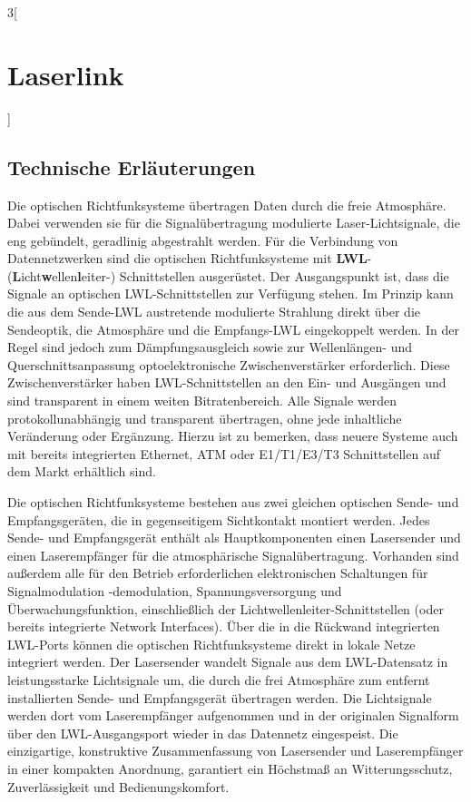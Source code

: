 \begin{multicols}{3}[\section{Laserlink}]
\subsection*{Technische Erläuterungen}
Die optischen Richtfunksysteme übertragen Daten durch die freie Atmosphäre. Dabei verwenden sie für die Signalübertragung modulierte Laser-Lichtsignale, die eng gebündelt, geradlinig abgestrahlt werden. Für die Verbindung von Datennetzwerken sind die optischen Richtfunksysteme mit  \textbf{LWL}- (\textbf{L}icht\textbf{w}ellen\textbf{l}eiter-) Schnittstellen ausgerüstet. Der Ausgangspunkt ist, dass die Signale an optischen LWL-Schnittstellen zur Verfügung stehen. Im Prinzip kann die aus dem Sende-LWL austretende modulierte Strahlung direkt über die Sendeoptik, die Atmosphäre und die Empfangs-LWL eingekoppelt werden. In der Regel sind jedoch zum Dämpfungsausgleich sowie zur Wellenlängen- und Querschnittsanpassung optoelektronische Zwischenverstärker erforderlich. Diese Zwischenverstärker haben LWL-Schnittstellen an den Ein- und Ausgängen und sind transparent in einem weiten Bitratenbereich. Alle Signale werden protokollunabhängig und transparent übertragen, ohne jede inhaltliche Veränderung oder Ergänzung. Hierzu ist zu bemerken, dass neuere Systeme auch mit bereits integrierten Ethernet, ATM oder E1/T1/E3/T3 Schnittstellen auf dem Markt erhältlich sind. 

Die optischen Richtfunksysteme bestehen aus zwei gleichen optischen Sende- und Empfangsgeräten, die in gegenseitigem Sichtkontakt montiert werden. Jedes Sende- und Empfangsgerät enthält als Hauptkomponenten einen Lasersender und einen Laserempfänger für die atmosphärische Signalübertragung. Vorhanden sind außerdem alle für den Betrieb erforderlichen elektronischen Schaltungen für Signalmodulation -demodulation, Spannungsversorgung und Überwachungsfunktion, einschließlich der Lichtwellenleiter-Schnittstellen (oder bereits integrierte Network Interfaces). Über die in die Rückwand integrierten LWL-Ports können die optischen Richtfunksysteme direkt in lokale Netze integriert werden. 
Der Lasersender wandelt Signale aus dem LWL-Datensatz in leistungsstarke Lichtsignale um, die durch die frei Atmosphäre zum entfernt installierten Sende- und Empfangsgerät übertragen werden. Die Lichtsignale werden dort vom Laserempfänger aufgenommen und in der originalen Signalform über den LWL-Ausgangsport wieder in das Datennetz eingespeist. Die einzigartige, konstruktive Zusammenfassung von Lasersender und Laserempfänger in einer kompakten Anordnung, garantiert ein Höchstmaß an Witterungsschutz, Zuverlässigkeit und Bedienungskomfort. 


\end{multicols}
